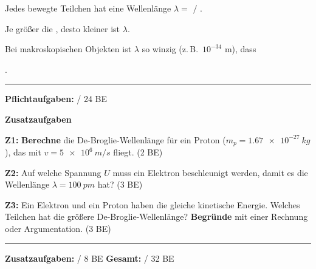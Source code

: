 \documentclass[11pt,a4paper]{article}
\begin{document}

\begin{tcolorbox}[merkbox={Kasten 3: Merksatz De-Broglie-Wellenlänge}]
Jedes bewegte Teilchen hat eine Wellenlänge \quad $\lambda = $ \underline{\hspace{1cm}} $/$ \underline{\hspace{1cm}}.

\vspace{0.3em}
Je größer die \underline{\hspace{2.5cm}}, desto kleiner ist $\lambda$.

\vspace{0.3em}
Bei makroskopischen Objekten ist $\lambda$ so winzig (z.\,B.\ $10^{-34}$ m), dass

\vspace{0.3em}
\underline{\hspace{10cm}}.
\end{tcolorbox}

\vspace{0.5em}

\begin{center}
\rule{8cm}{0.5pt}

\textbf{Pflichtaufgaben:} \underline{\hspace{1.5cm}} / 24 BE
\end{center}

\vspace{0.5em}


{\large\textbf{Zusatzaufgaben}}

\vspace{0.3em}

\textbf{Z1:} \textbf{Berechne} die De-Broglie-Wellenlänge für ein Proton ($m_p = \SI{1,67e-27}{kg}$), das mit $v = \SI{5e6}{m/s}$ fliegt. \hfill (2 BE)

\vspace{2.5cm}

\textbf{Z2:} Auf welche Spannung $U$ muss ein Elektron beschleunigt werden, damit es die Wellenlänge $\lambda = \SI{100}{pm}$ hat? \hfill (3 BE)

\vspace{3cm}

\textbf{Z3:} Ein Elektron und ein Proton haben die gleiche kinetische Energie. Welches Teilchen hat die größere De-Broglie-Wellenlänge? \textbf{Begründe} mit einer Rechnung oder Argumentation. \hfill (3 BE)

\vspace{3cm}

\begin{center}
\rule{8cm}{0.5pt}

\textbf{Zusatzaufgaben:} \underline{\hspace{1.5cm}} / 8 BE \hspace{2cm} \textbf{Gesamt:} \underline{\hspace{1.5cm}} / 32 BE
\end{center}
\end{document}
